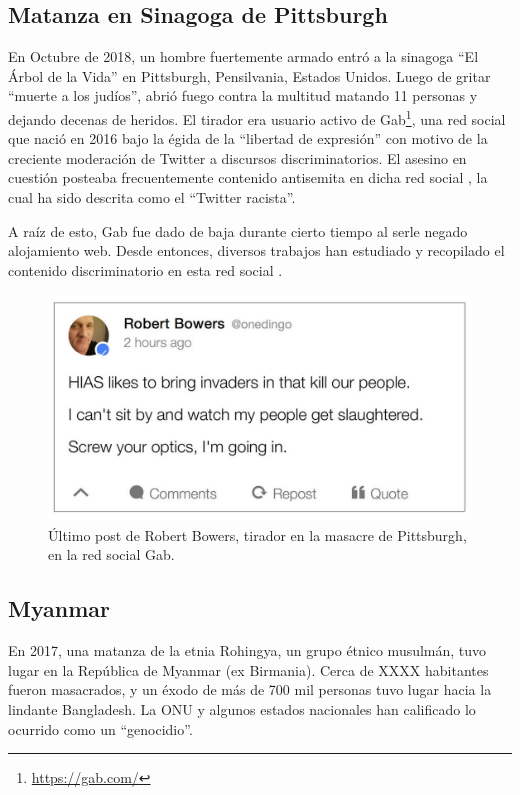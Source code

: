 \subsection{Matanza en Sinagoga de Pittsburgh}

En Octubre de 2018, un hombre fuertemente armado entró a la sinagoga ``El Árbol de la Vida'' en Pittsburgh, Pensilvania, Estados Unidos. Luego de gritar ``muerte a los judíos'', abrió fuego contra la multitud matando 11 personas y dejando decenas de heridos. El tirador era usuario activo de Gab\footnote{\url{https://gab.com/}}, una red social que nació en 2016 bajo la égida de la ``libertad de expresión'' con motivo de la creciente moderación de Twitter a discursos discriminatorios. El asesino en cuestión posteaba frecuentemente contenido antisemita en dicha red social \cite{mcilroy2019welcome}, la cual ha sido descrita como el ``Twitter racista''.

A raíz de esto, Gab fue dado de baja durante cierto tiempo al serle negado alojamiento web. Desde entonces, diversos trabajos han estudiado y recopilado el contenido discriminatorio en esta red social \cite{mcilroy2019welcome,kennedy2018gab}.


\begin{figure}[htbp]
    \centering
    \includegraphics[height=6cm, keepaspectratio]{img/gab-pittsburgh-post.jpg}
    \caption{Último post de Robert Bowers, tirador en la masacre de Pittsburgh, en la red social Gab.}
    \label{fig:gab_post}
\end{figure}


\subsection{Myanmar}
%
En 2017, una matanza de la etnia Rohingya, un grupo étnico musulmán, tuvo lugar en la República de Myanmar (ex Birmania). Cerca de XXXX habitantes fueron masacrados, y un éxodo de más de 700 mil personas tuvo lugar hacia la lindante Bangladesh. La ONU y algunos estados nacionales han calificado lo ocurrido como un ``genocidio''.


